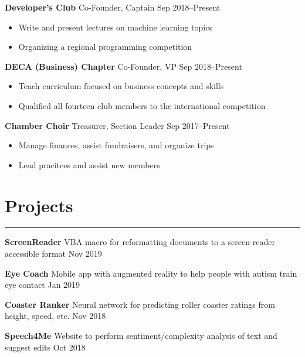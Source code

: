 \documentclass[11pt]{article}
\newcommand{\resumesection}[1]{\vspace{-0.3cm}\section*{\color{highlight}#1}\vspace{-0.3cm}\hrule\vspace{0.3cm}}
\begin{document}
\textbf{Developer's Club} Co-Founder, Captain \hfill Sep 2018--Present \par
\begin{itemize}
	\item Write and present lectures on machine learning topics
	\item Organizing a regional programming competition
\end{itemize}\vspace{0.1cm}

\textbf{DECA (Business) Chapter} Co-Founder, VP \hfill Sep 2018--Present \par
\begin{itemize}
	\item Teach curriculum focused on business concepts and skills
	\item Qualified all fourteen club members to the international competition
\end{itemize}\vspace{0.1cm}

\textbf{Chamber Choir} Treasurer, Section Leader \hfill Sep 2017--Present \par
\begin{itemize}
	\item Manage finances, assist fundraisers, and organize trips
	\item Lead pracitces and assist new members
\end{itemize}

\resumesection{Projects}

\textbf{ScreenReader} VBA macro for reformatting documents to a screen-reader accessible format \hfill Nov 2019 \par
\vspace{0.1cm}

\textbf{Eye Coach} Mobile app with augmented reality to help people with autism train eye contact \hfill Jan 2019 \par
\vspace{0.1cm}

\textbf{Coaster Ranker} Neural network for predicting roller coaster ratings from height, speed, etc.  \hfill Nov 2018\par
\vspace{0.1cm}

\textbf{Speech4Me} Website to perform sentiment/complexity analysis of text and suggest edits \hfill Oct 2018 \par
\vspace{0.1cm}
\end{document}
